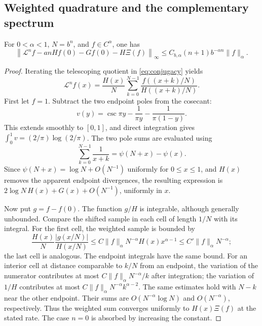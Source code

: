\documentclass[11pt,a4paper]{article}
\numberwithin{equation}{section}
\theoremstyle{definition}
\theoremstyle{remark}
\newcommand{\Lop}{\mathcal L}
\begin{document}
\subsection{Weighted quadrature and the complementary spectrum}
\begin{lemma}
\label{lem:quadrature}
For $0<\alpha<1$, $N=b^n$, and $f\in C^\alpha$, one has
\begin{equation}
 \left\|\Lop^n f-a n H f(0)-G f(0)-H\Xi(f)\right\|_\infty
 \le C_{b,\alpha}(n+1)b^{-\alpha n}\|f\|_\alpha.
 \label{eq:C0-remainder}
\end{equation}
\end{lemma}
\begin{proof}
Iterating the telescoping quotient in \cref{eq:conjugacy} yields
\begin{equation}
 \Lop^n f(x)=\frac{H(x)}N\sum_{k=0}^{N-1}
             \frac{f((x+k)/N)}{H((x+k)/N)}.
 \label{eq:iterate}
\end{equation}
First let $f=1$. Subtract the two endpoint poles from the cosecant:
\[
 v(y)=\csc\pi y-\frac1{\pi y}-\frac1{\pi(1-y)}.
\]
This extends smoothly to $[0,1]$, and direct integration gives
$\int_0^1v=(2/\pi)\log(2/\pi)$. The two pole sums are evaluated using
\[
 \sum_{k=0}^{N-1}\frac1{x+k}=\psi(N+x)-\psi(x).
\]
Since $\psi(N+x)=\log N+O(N^{-1})$ uniformly for $0\le x\le1$, and
$H(x)$ removes the apparent endpoint divergences, the resulting expression
is $2\log N\,H(x)+G(x)+O(N^{-1})$, uniformly in $x$.

Now put $g=f-f(0)$. The function $g/H$ is integrable, although generally
unbounded. Compare the shifted sample in each cell of length $1/N$ with
its integral. For the first cell, the weighted sample is bounded by
\[
 \frac{H(x)}N\frac{|g(x/N)|}{H(x/N)}
 \le C\|f\|_\alpha N^{-\alpha}H(x)x^{\alpha-1}
 \le C'\|f\|_\alpha N^{-\alpha};
\]
the last cell is analogous. The endpoint integrals have the same bound.
For an interior cell at distance comparable to $k/N$ from an endpoint,
the variation of the numerator contributes at most
$C\|f\|_\alpha N^{-\alpha}/k$ after integration; the variation of $1/H$
contributes at most $C\|f\|_\alpha N^{-\alpha}k^{\alpha-2}$.
The same estimates hold with $N-k$ near the other endpoint.
Their sums are $O(N^{-\alpha}\log N)$ and $O(N^{-\alpha})$, respectively.
Thus the weighted sum converges uniformly to $H(x)\Xi(f)$ at the stated
rate. The case $n=0$ is absorbed by increasing the constant.
\end{proof}
\end{document}
